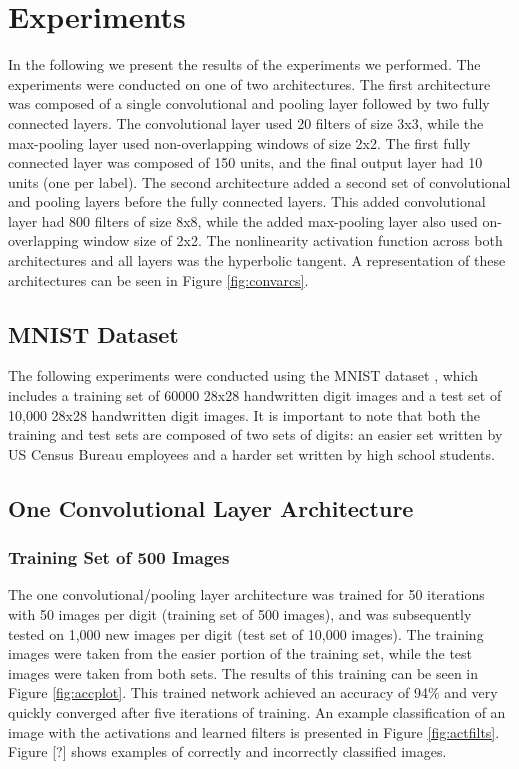 \documentclass[10pt,twocolumn,letterpaper]{article}
\begin{document}
\section{Experiments}

In the following we present the results of the experiments we performed. The experiments were conducted
on one of two architectures. The first architecture was composed of a single convolutional and pooling
layer followed by two fully connected layers. The convolutional layer used 20 filters of size 3x3,
while the max-pooling layer used non-overlapping windows of size 2x2. The first fully connected layer
was composed of 150 units, and the final output layer had 10 units (one per label). The second
architecture added a second set of convolutional and pooling layers before the fully connected layers.
This added convolutional layer had 800 filters of size 8x8, while the added max-pooling layer also used
on-overlapping window size of 2x2. The nonlinearity activation function across both architectures and
all layers was the hyperbolic tangent. A representation of these architectures can be seen in Figure
\ref{fig:convarcs}.

\subsection{MNIST Dataset}

The following experiments were conducted using the MNIST dataset \cite{MNIST}, which includes a training set of
60000 28x28 handwritten digit images and a test set of 10,000 28x28 handwritten digit images.
It is important to note that both the training and test sets are composed of two sets of digits:
an easier set written by US Census Bureau employees and a harder set written by high school students.

\subsection{One Convolutional Layer Architecture}

\subsubsection{Training Set of 500 Images}

The one convolutional/pooling layer architecture was trained for 50 iterations with 50 images per digit
(training set of 500 images), and was subsequently tested on
1,000 new images per digit (test set of 10,000 images).
The training images were taken from the easier portion of the training set, while the test images were taken from
both sets. The results of this training can be seen in Figure \ref{fig:accplot}. This trained network achieved an 
accuracy of 94\% and very quickly converged after five iterations of training. An example 
classification of an image with the activations and learned filters is presented
in Figure \ref{fig:actfilts}. Figure [?] shows examples of correctly and incorrectly classified images.
\end{document}
